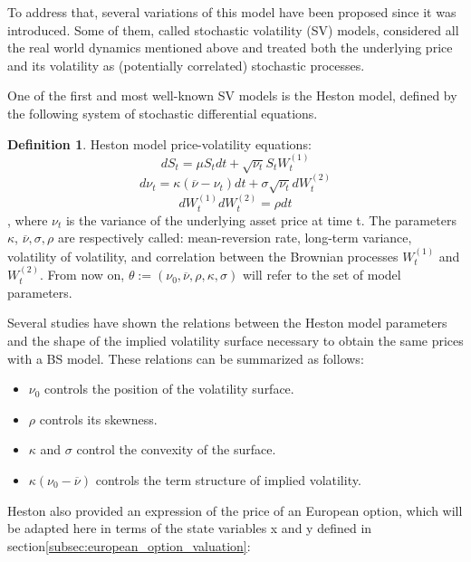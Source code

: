 \documentclass[12,twoside]{mammeTFM}
\theoremstyle{definition}
\newtheorem{definition}[thm]{Definition}
\theoremstyle{remark}
\begin{document}
To address that, several variations of this model have been proposed since it was introduced. Some of them, called stochastic volatility (SV) models, considered all the real world dynamics mentioned above and treated both the underlying price and its volatility as (potentially correlated) stochastic processes.

One of the first and most well-known SV models is the Heston model, defined by the following system of stochastic differential equations.

\begin{definition} Heston model price-volatility equations:
$$
dS_t = \mu S_t dt + \sqrt{\nu_t} S_t W_t^{(1)}
$$
$$
d\nu_t = \kappa(\overline{\nu} - \nu_t) dt + \sigma \sqrt{\nu_t}dW_t^{(2)}
$$
$$
dW_t^{(1)}dW_t^{(2)} = \rho dt
$$
, where $\nu_t$ is the variance of the underlying asset price at time t. The parameters $\kappa$, $\overline{\nu}, \sigma, \rho$ are respectively called: mean-reversion rate, long-term variance, volatility of volatility, and correlation between the Brownian processes $W_t^{(1)}$ and $W_t^{(2)}$. From now on, $\theta := (\nu_0, \overline{\nu}, \rho, \kappa, \sigma)$ will refer to the set of model parameters.
\end{definition}

Several studies have shown the relations between the Heston model parameters and the shape of the implied volatility surface \cite{cla11, gat06, gil12, jan11} necessary to obtain the same prices with a BS model. These relations can be summarized as follows:

\begin{itemize} \label{hes_param_properties}
\item $\nu_0$ controls the position of the volatility surface.
\item $\rho$ controls its skewness.
\item $\kappa$ and $\sigma$ control the convexity of the surface.
\item $\kappa(\nu_0 - \overline{\nu})$ controls the term structure of implied volatility.
\end{itemize}

Heston also provided an expression of the price of an European option, which will be adapted here in terms of the state variables x and y defined in section\ref{subsec:european_option_valuation}:
\end{document}
